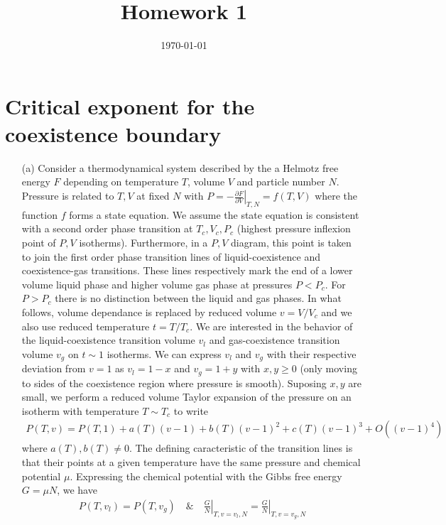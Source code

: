 \documentclass[10pt, a4paper]{article}
\title{Homework 1} %
\author{\PA} %
\date{\today} %
\begin{document}
\maketitlepage

\maketableofcontents


\footnotesize{
\section{Critical exponent for the coexistence boundary}
\begin{enumerate}
  \item[(a)] Consider a thermodynamical system described by the a Helmotz free energy $F$ depending on temperature $T$, volume $V$ and particle number $N$. Pressure is related to $T, V$ at fixed $N$ with $P= -\left.\frac{\partial F}{\partial V}\right|_{T, N} = f(T, V)$ where the function $f$ forms a state equation. We assume the state equation is consistent with a second order phase transition at $T_c, V_c, P_c$ (highest pressure inflexion point of $P, V$ isotherms). Furthermore, in a $P, V$ diagram, this point is taken to join the first order phase transition lines of liquid-coexistence and coexistence-gas transitions. These lines respectively mark the end of a lower volume liquid phase and higher volume gas phase at pressures $P<P_c$. For $P> P_c$ there is no distinction between the liquid and gas phases. In what follows, volume dependance is replaced by reduced volume $v = V/V_c$ and we also use reduced temperature $t=T/T_c$. We are interested in the behavior of the liquid-coexistence transition volume $v_l$ and gas-coexistence transition volume $v_g$ on $t \sim 1$ isotherms. We can express $v_l$ and $v_g$ with their respective deviation from $v = 1$ as $v_l = 1 - x$ and $v_g = 1 + y$ with $x , y \ge 0$ (only moving to sides of the coexistence region where pressure is smooth). Suposing $x, y$ are small, we perform a reduced volume Taylor expansion of the pressure on an isotherm with temperature $T \sim T_c$ to write 
  \begin{align*}
    P(T, v) =  P(T, 1) + a(T) (v-1) + b(T) (v-1)^2 + c(T) (v-1)^3 + O((v-1)^4)
  \end{align*}
  where $a(T), b(T) \neq 0$. The defining caracteristic of the transition lines is that their points at a given temperature have the same pressure and chemical potential $\mu$. Expressing the chemical potential with the Gibbs free energy $G = \mu N$, we have 
  \begin{align*}
    P(T, v_l) = P(T, v_g) \quad \& \quad  \left.\frac{G}{N}\right|_{T, v=v_l, N} = \left.\frac{G}{N}\right|_{T, v=v_g, N}

\end{align*}
\end{enumerate}}
\end{document}

